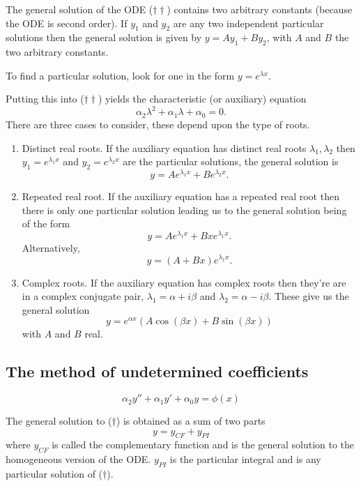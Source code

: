 \documentclass[10pt, a4paper]{article}
\begin{document}
The general solution of the ODE ($\dagger\dagger$) contains two arbitrary constants
(because the ODE is second order).
If $y_1$ and $y_2$ are any two independent particular solutions then the general solution is given by $y = Ay_1 + By_2$,
with $A$ and $B$ the two arbitrary constants.

To find a particular solution,
look for one in the form $y = e ^ {\lambda x}$.

Putting this into ($\dagger\dagger$) yields the characteristic (or auxiliary) equation
\[
\alpha_2\lambda ^ 2 + \alpha_1\lambda + \alpha_0 = 0.
\]
There are three cases to consider,
these depend upon the type of roots.

\begin{enumerate}[label = (\roman*)]
    \item Distinct real roots.
    If the auxiliary equation has distinct real roots $\lambda_1, \lambda_2$ then $y_1 = e ^ {\lambda_1x}$ and $y_2 = e ^ {\lambda_2x}$ are the particular solutions,
    the general solution is
    \[
    y = Ae ^ {\lambda_1x} + Be ^ {\lambda_2x}.
    \]
    \item Repeated real root.
    If the auxiliary equation has a repeated real root then there is only one particular solution leading us to the general solution being of the form
    \[
    y = Ae ^ {\lambda_1x} + Bxe ^ {\lambda_1x}.
    \]
    Alternatively,
    \[
    y = (A + Bx)e ^ {\lambda_1x}.
    \]
    \item Complex roots.
    If the auxiliary equation has complex roots then they're are in a complex conjugate pair,
    $\lambda_1 = \alpha + i\beta$ and $\lambda_2 = \alpha - i\beta$.
    These give us the general solution
    \[
    y = e ^ {\alpha x}(A\cos(\beta x) + B\sin(\beta x))
    \]
    with $A$ and $B$ real.
\end{enumerate}

\subsection{The method of undetermined coefficients}
\begin{equation}\tag{$\dagger$}
    \alpha_2y'' + \alpha_1y' + \alpha_0y = \phi(x)
\end{equation}

The general solution to ($\dagger$) is obtained as a sum of two parts
\[
y = y_{CF} + y_{PI}
\]
where $y_{CF}$ is called the complementary function and is the general solution to the homogeneous version of the ODE.
$y_{PI}$ is the particular integral and is any particular solution of ($\dagger$).
\end{document}

